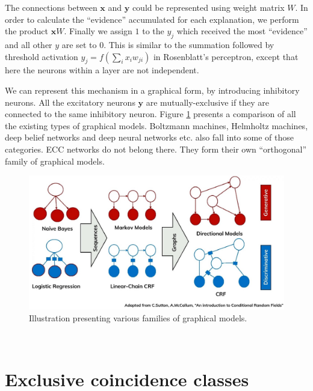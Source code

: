 \documentclass[12pt]{article}
\begin{document}
The connections between $\boldsymbol{x}$ and $\boldsymbol{y}$ could be represented using weight matrix $W$. In order to calculate the ``evidence'' accumulated for each explanation, we perform the product $\boldsymbol{x}W$.
Finally we assign $1$ to the $y_j$ which received the most ``evidence'' and all other $y$ are set to $0$. This is similar to the summation followed by threshold activation $y_j=f(\sum_{i}x_{i}w_{ji})$ in Rosenblatt's perceptron, except that here the neurons within a layer are not independent.

We can represent this mechanism in a graphical form, by introducing inhibitory neurons. All the excitatory neurons $\boldsymbol{y}$ are mutually-exclusive if they are connected to the same inhibitory neuron. Figure \ref{fig:graphical_models}
presents a comparison of all the existing types of graphical models. Boltzmann machines, Helmholtz machines, deep belief networks and deep neural networks etc. also fall into some of those categories. ECC networks do not belong there. They form their own ``orthogonal'' family of graphical models. 
\begin{figure}[!htbp]
	\centering
	\includegraphics[width=14cm]{crf}
	\caption{Illustration presenting various families of graphical models. }
	\label{fig:graphical_models}
\end{figure} \\

\section{Exclusive coincidence classes}
\end{document}
